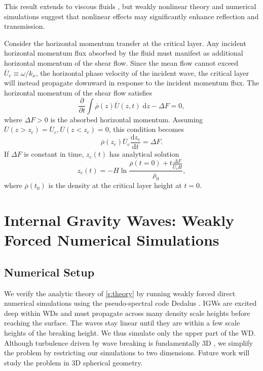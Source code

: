 \documentclass[
        fleqn,
        usenatbib,
    ]{mnras}
\newcommand*{\rd}[2]{\frac{\mathrm{d}#1}{\mathrm{d}#2}}
\newcommand*{\pd}[2]{\frac{\partial#1}{\partial#2}}
\begin{document}
This result extends to viscous fluids \citep{hazel}, but weakly nonlinear theory
\citep{brown_stewartson} and numerical simulations \citep{winters1994} suggest
that nonlinear effects may significantly enhance reflection and transmission.

Consider the horizontal momentum transfer at the critical layer. Any incident
horizontal momentum flux absorbed by the fluid must manifest as additional
horizontal momentum of the shear flow. Since the mean flow cannot exceed
$\overline{U}_c \equiv \omega/k_x$, the horizontal phase velocity of the
incident wave, the critical layer will instead propagate downward in response to
the incident momentum flux. The horizontal momentum of the shear flow satisfies
\begin{equation}
    \pd{}{t}\int\limits \overline{\rho}(z) \overline{U}(z, t)\;\mathrm{d}z
        - \Delta F = 0,
\end{equation}
where $\Delta F > 0$ is the absorbed horizontal momentum. Assuming
$\overline{U}(z > z_c) = \overline{U}_c, \overline{U}(z < z_c) = 0$, this
condition becomes
\begin{equation}
    \overline{\rho}(z_c) \overline{U}_c\rd{z_c}{t} = \Delta F.\label{eq:zc_anal}
\end{equation}
If $\Delta F$ is constant in time, $z_c(t)$ has analytical solution
\begin{equation}
    z_c(t) = -H\ln \frac{\overline{\rho}(t = 0)
        + t\frac{\Delta F}{\overline{U}_c H}}{\overline{\rho}_0}
        ,\label{eq:zc_sol}
\end{equation}
where $\overline{\rho}(t_0)$ is the density at the critical layer height at $t =
0$.

\section{Internal Gravity Waves: Weakly Forced Numerical
Simulations}\label{s:sim}

\subsection{Numerical Setup}\label{ss:numerics}

We verify the analytic theory of \autoref{s:theory} by running weakly forced
direct numerical simulations using the pseudo-spectral code Dedalus
\citep{dedalus,dedalus2}. IGWs are excited deep within WDs and must propagate
across many density scale heights before reaching the surface. The waves stay
linear until they are within a few scale heights of the breaking height. We thus
simulate only the upper part of the WD\@. Although turbulence driven by wave
breaking is fundamentally 3D \citep{klostermeyer}, we simplify the problem by
restricting our simulations to two dimensions. Future work will study the
problem in 3D spherical geometry.
\end{document}
